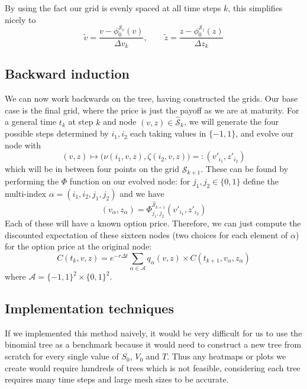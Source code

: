 By using the fact our grid is evenly spaced at all time steps $k$, this simplifies nicely to
\begin{equation}
    \tilde v = \frac{v - \phi_{0}^{\mathcal S_v}(v)}{\Delta v_k}, \qquad \tilde z = \frac{z - \phi_{0}^{\mathcal S_z}(z)}{\Delta z_k}
\end{equation}

\subsection{Backward induction}

We can now work backwards on the tree, having constructed the grids. Our base case is the final grid, where the price is just the payoff as we are at maturity. For a general time $t_k$ at step $k$ and node $(v, z) \in \hat{\mathcal S}_{k}$, we will generate the four possible steps determined by $i_1, i_2$ each taking values in $\{-1, 1\}$, and evolve our node with
\begin{equation}
    (v, z) \mapsto \big(\nu (i_1, v, z), \zeta (i_2, v, z)\big) =:(v'_{i_1}, z'_{i_2})
\end{equation}
which will be in between four points on the grid $\hat{\mathcal S}_{k+1}$. These can be found by performing the $\Phi$ function on our evolved node: for $j_1, j_2 \in \{0, 1\}$ define the multi-index $\alpha = (i_1, i_2, j_1, j_2)$ and we have
\begin{equation}
    (v_\alpha, z_\alpha) = \Phi^{\hat{\mathcal S}_{k+1}}_{j_1, j_2}(v'_{i_1}, z'_{i_2})
\end{equation}
Each of these will have a known option price. Therefore, we can just compute the discounted expectation of these sixteen nodes (two choices for each element of $\alpha$) for the option price at the original node:
\begin{equation}
    C(t_k, v, z) = e^{-r\Delta t} \sum_{\alpha \in \mathcal A} q_\alpha(v, z)\times C(t_{k+1}, v_\alpha, z_\alpha)
\end{equation}
where $\mathcal A = \{-1, 1\}^2 \times \{0, 1\}^2$.

\subsection{Implementation techniques}

If we implemented this method naively, it would be very difficult for us to use the binomial tree as a benchmark because it would need to construct a new tree from scratch for every single value of $S_0$, $V_0$ and $T$. Thus any heatmaps or plots we create would require hundreds of trees which is not feasible, considering each tree requires many time steps and large mesh sizes to be accurate. 

